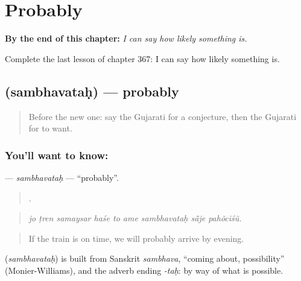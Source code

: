
\chapter{Probably}
\label{ch:gu-probably}

\begin{chapteropening}
\textbf{By the end of this chapter:} \emph{I can say how likely something is.}

Complete the last lesson of chapter 367: I can say how likely something is.
\end{chapteropening}

\section[\texorpdfstring{\gu{સંભવતઃ} (sambhavataḥ)}{સંભવતઃ (sambhavataḥ)}]{ (sambhavataḥ) — probably}

\label{lesson:GU-C367-sambhavatah}



\begin{quote}
Before the new one: say the Gujarati for a conjecture, then the Gujarati for to want.
\end{quote}

\subsection*{You'll want to know: }
\textbf{} — \emph{sambhavataḥ} — \textquotedblleft{}probably\textquotedblright{}.

\begin{quote}
        .
\end{quote}

\begin{quote}
\emph{jo ṭren samaysar haśe to ame sambhavataḥ sā̃je pahõcīśũ.}
\end{quote}

\begin{quote}
If the train is on time, we will probably arrive by evening.
\end{quote}

\begin{cousinweb}
\textbf{} (\emph{sambhavataḥ}) is built from Sanskrit \emph{sambhava}, \textquotedblleft{}coming about, possibility\textquotedblright{} (Monier-Williams), and the adverb ending \emph{-taḥ}: by way of what is possible.
\end{cousinweb}


